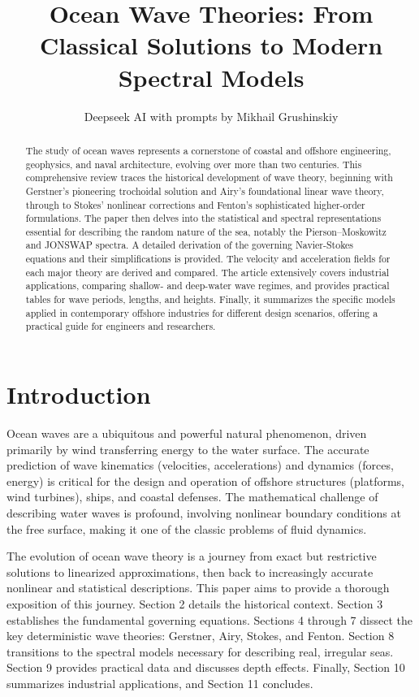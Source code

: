 \documentclass[11pt,letterpaper]{article}
\title{Ocean Wave Theories: From Classical Solutions to Modern Spectral Models}
\author{Deepseek AI with prompts by Mikhail Grushinskiy}
\date{}
\begin{document}
    \maketitle

    \begin{abstract}
        \noindent The study of ocean waves represents a cornerstone of coastal and offshore engineering, geophysics, and naval architecture, evolving over more than two centuries. This comprehensive review traces the historical development of wave theory, beginning with Gerstner's pioneering trochoidal solution and Airy's foundational linear wave theory, through to Stokes' nonlinear corrections and Fenton’s sophisticated higher-order formulations. The paper then delves into the statistical and spectral representations essential for describing the random nature of the sea, notably the Pierson–Moskowitz and JONSWAP spectra. A detailed derivation of the governing Navier-Stokes equations and their simplifications is provided. The velocity and acceleration fields for each major theory are derived and compared. The article extensively covers industrial applications, comparing shallow- and deep-water wave regimes, and provides practical tables for wave periods, lengths, and heights. Finally, it summarizes the specific models applied in contemporary offshore industries for different design scenarios, offering a practical guide for engineers and researchers.
    \end{abstract}

    \newpage
    \tableofcontents
    \newpage

    \section{Introduction}
    Ocean waves are a ubiquitous and powerful natural phenomenon, driven primarily by wind transferring energy to the water surface. The accurate prediction of wave kinematics (velocities, accelerations) and dynamics (forces, energy) is critical for the design and operation of offshore structures (platforms, wind turbines), ships, and coastal defenses. The mathematical challenge of describing water waves is profound, involving nonlinear boundary conditions at the free surface, making it one of the classic problems of fluid dynamics.

    The evolution of ocean wave theory is a journey from exact but restrictive solutions to linearized approximations, then back to increasingly accurate nonlinear and statistical descriptions. This paper aims to provide a thorough exposition of this journey. Section 2 details the historical context. Section 3 establishes the fundamental governing equations. Sections 4 through 7 dissect the key deterministic wave theories: Gerstner, Airy, Stokes, and Fenton. Section 8 transitions to the spectral models necessary for describing real, irregular seas. Section 9 provides practical data and discusses depth effects. Finally, Section 10 summarizes industrial applications, and Section 11 concludes.
\end{document}
